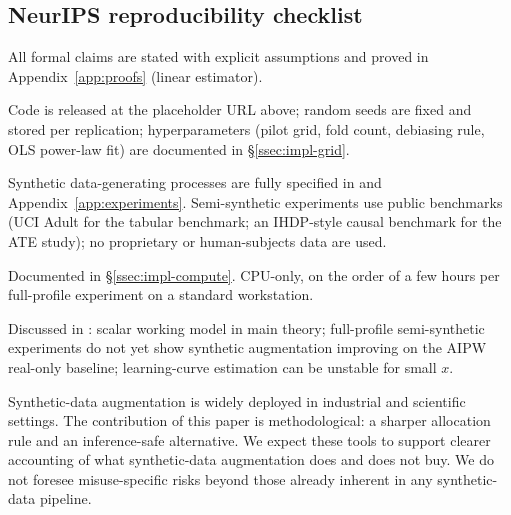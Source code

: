 \subsection{NeurIPS reproducibility checklist}\label{ssec:impl-checklist}

\begin{description}[leftmargin=*,style=nextline]
\item[Theoretical claims.] All formal claims are stated with explicit assumptions and proved in Appendix~\ref{app:proofs} (linear estimator).
\item[Experimental results.] Code is released at the placeholder URL above; random seeds are fixed and stored per replication; hyperparameters (pilot grid, fold count, debiasing rule, OLS power-law fit) are documented in \S\ref{ssec:impl-grid}.
\item[Data.] Synthetic data-generating processes are fully specified in  and Appendix~\ref{app:experiments}. Semi-synthetic experiments use public benchmarks (UCI Adult for the tabular benchmark; an IHDP-style causal benchmark for the ATE study); no proprietary or human-subjects data are used.
\item[Compute.] Documented in \S\ref{ssec:impl-compute}. CPU-only, on the order of a few hours per full-profile experiment on a standard workstation.
\item[Limitations.] Discussed in : scalar working model in main theory; full-profile semi-synthetic experiments do not yet show synthetic augmentation improving on the AIPW real-only baseline; learning-curve estimation can be unstable for small $x$.
\item[Broader impacts.] Synthetic-data augmentation is widely deployed in industrial and scientific settings. The contribution of this paper is methodological: a sharper allocation rule and an inference-safe alternative. We expect these tools to support clearer accounting of what synthetic-data augmentation does and does not buy. We do not foresee misuse-specific risks beyond those already inherent in any synthetic-data pipeline.
\end{description}



